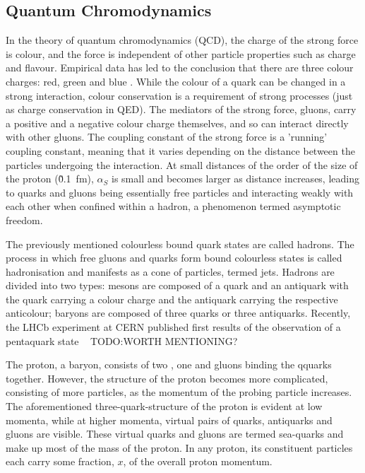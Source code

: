 \subsection{Quantum Chromodynamics}
\label{ss:quantum_chromodynamics}

In the theory of quantum chromodynamics (QCD), the charge of the strong force is colour, and the force is
independent of other particle properties such as charge and flavour. Empirical data has led to the conclusion
that there are three colour charges: red, green and blue \cite{Griffiths:1987tj}. While the colour of a quark
can be changed in a strong interaction, colour conservation is a requirement of strong processes (just as
charge conservation in QED). The mediators of the strong force, gluons, carry a positive and a negative colour
charge themselves, and so can interact directly with other gluons. The coupling constant of the strong force
is a 'running' coupling constant, meaning that it varies depending on the distance between the particles
undergoing the interaction. At small distances of the order of the size of the proton (\~0.1~fm),
$\alpha_{S}$ is small and becomes larger as distance increases, leading to quarks and gluons being essentially
free particles and interacting weakly with each other when confined within a hadron, a phenomenon termed
asymptotic freedom.

The previously mentioned colourless bound quark states are called hadrons. The process in which free gluons
and quarks form bound colourless states is called hadronisation and manifests as a cone of particles, termed
jets. Hadrons are divided into two types: mesons are composed of a quark and an antiquark with the quark
carrying a colour charge and the antiquark carrying the respective anticolour; baryons are composed of three
quarks or three antiquarks. Recently, the LHCb experiment at CERN published first results of the observation
of a pentaquark state ~\cite{Aaij:2015tga} TODO:WORTH MENTIONING? %

The proton, a baryon, consists of two \uquarks, one \dquark and gluons binding the qquarks together. However,
the structure of the proton becomes more complicated, consisting of more particles, as the momentum of the
probing particle increases. The aforementioned three-quark-structure of the proton is evident at low momenta,
while at higher momenta, virtual pairs of quarks, antiquarks and gluons are visible. These virtual quarks and
gluons are termed sea-quarks and make up most of the mass of the proton. In any proton, its constituent
particles each carry some fraction, $x$, of the overall proton momentum. %

